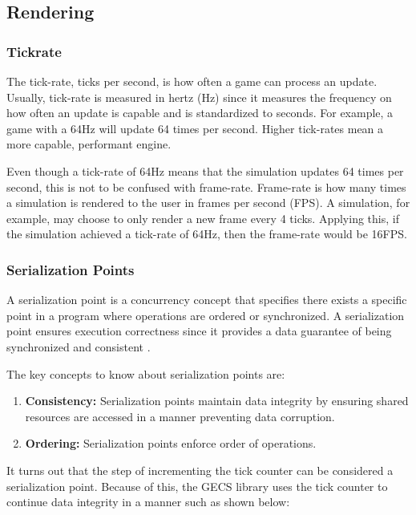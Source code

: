\subsection{Rendering}

\subsubsection{Tickrate}

The tick-rate, ticks per second, is how often a game can process an update. Usually, tick-rate is measured in hertz (Hz) since it measures the frequency on how often an update is capable and is standardized to seconds\cite{Gregory_2018}. For example, a game with a 64Hz will update 64 times per second. Higher tick-rates mean a more capable, performant engine.

Even though a tick-rate of 64Hz means that the simulation updates 64 times per second, this is not to be confused with frame-rate. Frame-rate is how many times a simulation is rendered to the user in frames per second (FPS). A simulation, for example, may choose to only render a new frame every 4 ticks. Applying this, if the simulation achieved a tick-rate of 64Hz, then the frame-rate would be 16FPS.

\subsubsection{Serialization Points}
A serialization point is a concurrency concept that specifies there exists a specific point in a program where operations are ordered or synchronized. A serialization point ensures execution correctness since it provides a data guarantee of being synchronized and consistent \cite{Herlihy_2021b}.

The key concepts to know about serialization points are:
\begin{enumerate}
    \item \textbf{Consistency:} Serialization points maintain data integrity by ensuring shared resources are accessed in a manner preventing data corruption.
    \item \textbf{Ordering:} Serialization points enforce order of operations.
\end{enumerate}

It turns out that the step of incrementing the tick counter can be considered a serialization point. Because of this, the GECS library uses the tick counter to continue data integrity in a manner such as shown below:


